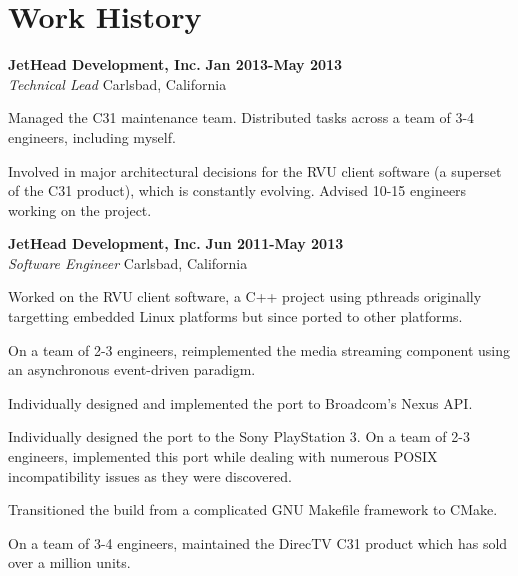 \section{Work History}
\begin{lonelist}

\item[] \textbf{JetHead Development, Inc.} \hfill \textbf{Jan 2013-May 2013}\\
  \textit{Technical Lead} \hfill Carlsbad, California
  \begin{innerlist}
  \item Managed the C31 maintenance team. Distributed tasks across a team of 3-4
      engineers, including myself.

  \item Involved in major architectural decisions for the RVU client software
      (a superset of the C31 product), which is constantly evolving. Advised
      10-15 engineers working on the project.
  \end{innerlist}

\item[] \textbf{JetHead Development, Inc.} \hfill \textbf{Jun 2011-May 2013}\\
  \textit{Software Engineer} \hfill Carlsbad, California
  \begin{innerlist}
  \item Worked on the RVU client software, a C++ project using pthreads
      originally targetting embedded Linux platforms but since ported to
      other platforms.

  \item On a team of 2-3 engineers, reimplemented the media streaming component
      using an asynchronous event-driven paradigm.

  \item Individually designed and implemented the port to Broadcom's Nexus API.

  \item Individually designed the port to the Sony PlayStation 3. On a team
      of 2-3 engineers, implemented this port while dealing with numerous
      POSIX incompatibility issues as they were discovered.

  \item Transitioned the build from a complicated GNU Makefile framework to
      CMake.

  \item On a team of 3-4 engineers, maintained the DirecTV C31 product which
      has sold over a million units.
  \end{innerlist}


\end{lonelist}
